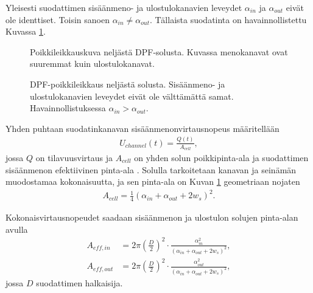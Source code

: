 Yleisesti suodattimen sisäänmeno- ja ulostulokanavien leveydet \(\alpha_{in}\) ja \(\alpha_{out}\) eivät ole identtiset. Toisin sanoen \(\alpha_{in} \neq \alpha_{out}\). Tällaista suodatinta on havainnollistettu Kuvassa \ref{fig:hac_dpf_clean}.
%
\begin{figure}[H]
    \centering 
               {Poikkileikkauskuva neljästä DPF-solusta. Kuvassa menokanavat ovat suuremmat kuin ulostulokanavat.}
    \caption{DPF-poikkileikkaus neljästä solusta. Sisäänmeno- ja ulostulokanavien leveydet eivät ole välttämättä samat. Havainnollistuksessa \(\alpha_{in}>\alpha_{out}\).}
    \label{fig:hac_dpf_clean}
\end{figure}

Yhden puhtaan suodatinkanavan sisäänmenonvirtausnopeus määritellään 
\begin{align}\label{eq:flow_velocity_clean}
    U_{channel}(t) = \frac{Q(t)}{A_{cell}},
\end{align}
jossa \(Q\) on tilavuusvirtaus ja \(A_{cell}\) on  yhden solun poikkipinta-ala ja suodattimen sisäänmenon efektiivinen pinta-ala \cite{Konstandopoulos2000}. Solulla tarkoitetaan kanavan ja seinämän muodostamaa kokonaisuutta, ja sen pinta-ala on Kuvan \ref{fig:hac_dpf_clean}  geometriaan nojaten
\begin{align}
    A_{cell}=\frac{1}{4}(\alpha_{in}+\alpha_{out}+2w_s)^2.
\end{align}

Kokonaisvirtausnopeudet saadaan sisäänmenon ja ulostulon solujen pinta-alan avulla
\begin{align}
    A_{eff, in} &= 2 \pi \left(\frac{D}{2}\right)^2 \cdot \frac{\alpha_{in}^2}{(\alpha_{in}+\alpha_{out}+2w_s)^2}, \label{eq:area_eff_in} \\
    A_{eff, out} &= 2 \pi \left(\frac{D}{2}\right)^2 \cdot \frac{\alpha_{out}^2}{(\alpha_{in}+\alpha_{out}+2w_s)^2},\label{eq:area_eff_out}
\end{align}
jossa \(D \) suodattimen halkaisija.%


